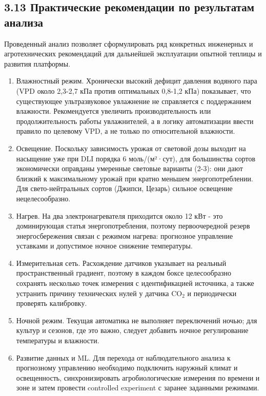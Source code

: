 \documentclass[a4paper,14pt]{extarticle}
\begin{document}
\hypertarget{ux43fux440ux430ux43aux442ux438ux447ux435ux441ux43aux438ux435-ux440ux435ux43aux43eux43cux435ux43dux434ux430ux446ux438ux438-ux43fux43e-ux440ux435ux437ux443ux43bux44cux442ux430ux442ux430ux43c-ux430ux43dux430ux43bux438ux437ux430}{%
\subsection{3.13 Практические рекомендации по результатам
анализа}\label{ux43fux440ux430ux43aux442ux438ux447ux435ux441ux43aux438ux435-ux440ux435ux43aux43eux43cux435ux43dux434ux430ux446ux438ux438-ux43fux43e-ux440ux435ux437ux443ux43bux44cux442ux430ux442ux430ux43c-ux430ux43dux430ux43bux438ux437ux430}}

Проведенный анализ позволяет сформулировать ряд конкретных инженерных и
агротехнических рекомендаций для дальнейшей эксплуатации опытной теплицы
и развития платформы.

\begin{enumerate}
\def\labelenumi{\arabic{enumi})}
\item
  Влажностный режим. Хронически высокий дефицит давления водяного пара
  (VPD около 2,3-2,7 кПа против оптимальных 0,8-1,2 кПа) показывает, что
  существующее ультразвуковое увлажнение не справляется с поддержанием
  влажности. Рекомендуется увеличить производительность или
  продолжительность работы увлажнителей, а в логику автоматизации ввести
  правило по целевому VPD, а не только по относительной влажности.
\item
  Освещение. Поскольку зависимость урожая от световой дозы выходит на
  насыщение уже при DLI порядка 6 моль/(м²·сут), для большинства сортов
  экономически оправданы умеренные световые варианты (2-3): они дают
  близкий к максимальному урожай при кратно меньшем энергопотреблении.
  Для свето-нейтральных сортов (Джипси, Цезарь) сильное освещение
  нецелесообразно.
\item
  Нагрев. На два электронагревателя приходится около 12 кВт - это
  доминирующая статья энергопотребления, поэтому первоочередной резерв
  энергосбережения связан с режимом нагрева: прогнозное управление
  уставками и допустимое ночное снижение температуры.
\item
  Измерительная сеть. Расхождение датчиков указывает на реальный
  пространственный градиент, поэтому в каждом боксе целесообразно
  сохранять несколько точек измерения с идентификацией источника, а
  также устранить причину технических нулей у датчика CO\(_2\) и
  периодически проверять калибровку.
\item
  Ночной режим. Текущая автоматика не выполняет переключений ночью; для
  культур и сезонов, где это важно, следует добавить ночное
  регулирование температуры и влажности.
\item
  Развитие данных и ML. Для перехода от наблюдательного анализа к
  прогнозному управлению необходимо подключить наружный климат и
  освещенность, синхронизировать агробиологические измерения по времени
  и зоне и затем провести controlled experiment с заранее заданными
  режимами.
\end{enumerate}
\end{document}
